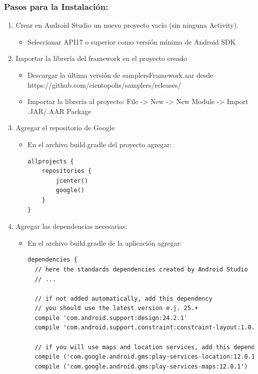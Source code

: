 \subsubsection{Pasos para la Instalación:}
\begin{enumerate}
	\item Crear en Android Studio un nuevo proyecto vacío (sin ninguna Activity).
		\begin{itemize}
		\item Seleccionar API17 o superior como versión mínima de Android SDK
		\end{itemize}
	\item Importar la librería del framework en el proyecto creado
		\begin{itemize}
		\item Descargar la última versión de samplersFramework.aar desde https://github.com/cientopolis/samplers/releases/
		\item Importar la librería al proyecto: File -> New -> New Module -> Import .JAR/.AAR Package
		\end{itemize}
	\item Agregar el repositorio de Google
		\begin{itemize}
			\item En el archivo build.gradle del proyecto agregar: 
			\begin{lstlisting}[language=XML, frame=single]
allprojects {
    repositories {
        jcenter()
        google()
    }
}
			\end{lstlisting}	
		\end{itemize}
	\item Agregar las dependencias necesarias:
		\begin{itemize}
			\item En el archivo build.gradle de la aplicación agregar: 
			\begin{lstlisting}[language=XML, frame=tlb]
dependencies {
  // here the standards dependencies created by Android Studio
  // ...

  // if not added automatically, add this dependency 
  // you should use the latest version e.j. 25.+
  compile 'com.android.support:design:24.2.1' 
  compile 'com.android.support.constraint:constraint-layout:1.0.2'

  // if you will use maps and location services, add this dependencies (you should use the latest version)
  compile ('com.google.android.gms:play-services-location:12.0.1')
  compile ('com.google.android.gms:play-services-maps:12.0.1')
  

\end{lstlisting}
\end{itemize}
\end{enumerate}
